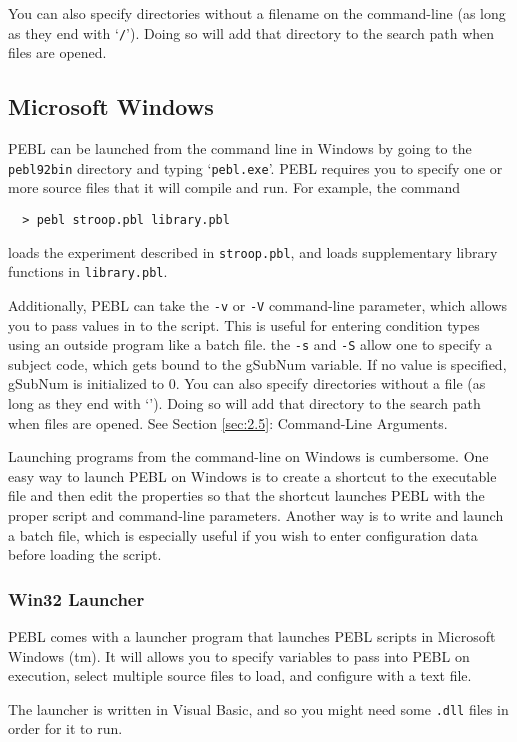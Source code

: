 You can also specify directories without a filename on the command-line (as long as they end with `\texttt{/}').  Doing so will add that directory to the search path when files are opened.

\subsection{ Microsoft Windows}

PEBL can be launched from the command line in Windows by going to the
\texttt{pebl\char92bin} directory and typing `\texttt{pebl.exe}'.
PEBL requires you to specify one or more source files that it will
compile and run.  For example, the command
\begin{verbatim}
  > pebl stroop.pbl library.pbl
\end{verbatim}
loads the experiment described in \texttt{stroop.pbl}, and loads supplementary library functions in \texttt{library.pbl}.

Additionally, PEBL can take the \texttt{-v} or \texttt{-V}
command-line parameter, which allows you to pass values in to the
script.  This is useful for entering condition types using an outside
program like a batch file. the \texttt{-s} and \texttt{-S} allow one
to specify a subject code, which gets bound to the gSubNum variable.
If no value is specified, gSubNum is initialized to 0.  You can also
specify directories without a file (as long as they end with
`\texttt{}').  Doing so will add that directory to the search
path when files are opened. See Section \ref{sec:2.5}: Command-Line
Arguments.


Launching programs from the command-line on Windows is cumbersome.
One easy way to launch PEBL on Windows is to create a shortcut to the
executable file and then edit the properties so that the shortcut
launches PEBL with the proper script and command-line parameters.
Another way is to write and launch a batch file, which is especially
useful if you wish to enter configuration data before loading the
script.

\subsubsection{ Win32 Launcher}
PEBL comes with a launcher program that launches PEBL scripts in
Microsoft Windows (tm).  It will allows you to specify variables to
pass into PEBL on execution, select multiple source files to load, and
configure with a text file.

The launcher is written in Visual Basic, and so you might need some
\texttt{.dll} files in order for it to run.

